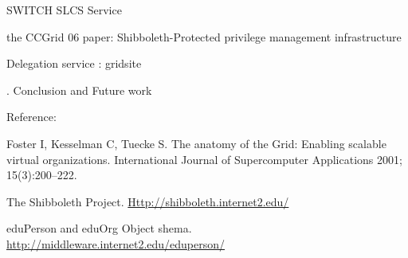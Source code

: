 \documentclass{article}
\begin{document}
SWITCH SLCS Service

the CCGrid 06 paper: Shibboleth-Protected privilege management
infrastructure

Delegation service : gridsite


\bigskip


\bigskip

{. Conclusion and Future work
\par}


\bigskip


\bigskip

Reference:

Foster I, Kesselman C, Tuecke S. The anatomy of the Grid: Enabling
scalable virtual organizations. International Journal of Supercomputer
Applications 2001; 15(3):200--222. 


\bigskip

The Shibboleth Project.
\href{http://shibboleth.internet2.edu/}{Http://shibboleth.internet2.edu/}


\bigskip

eduPerson and eduOrg Object shema.
\url{http://middleware.internet2.edu/eduperson/}


\bigskip
\end{document}
